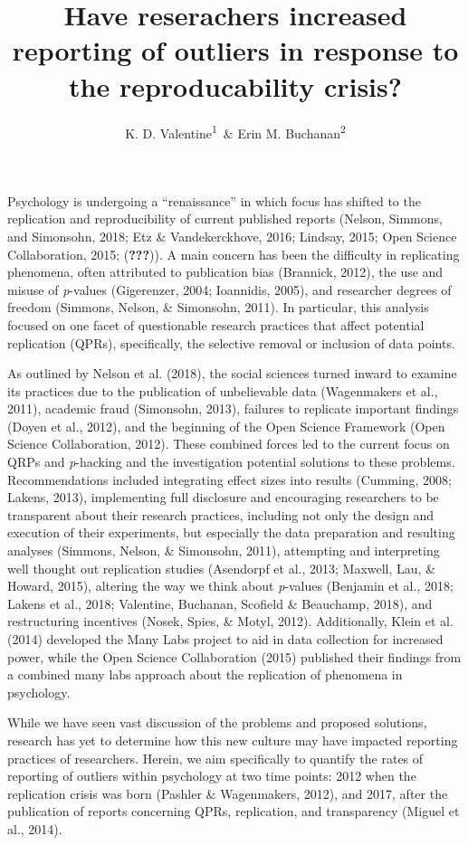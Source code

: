 \documentclass[english,man]{apa6}
\title{Have reserachers increased reporting of outliers in response to the
reproducability crisis?}
\author{K. D. Valentine\textsuperscript{1}~\& Erin M. Buchanan\textsuperscript{2}}
\affiliation{
    \vspace{0.5cm}
          \textsuperscript{1} University of Missouri\\
          \textsuperscript{2} Missouri State University  }
\theoremstyle{definition}
\theoremstyle{definition}
\theoremstyle{definition}
\theoremstyle{remark}
\begin{document}
\maketitle

\setcounter{secnumdepth}{0}



Psychology is undergoing a \enquote{renaissance} in which focus has
shifted to the replication and reproducibility of current published
reports (Nelson, Simmons, and Simonsohn, 2018; Etz \& Vandekerckhove,
2016; Lindsay, 2015; Open Science Collaboration, 2015;
({\textbf{???}})). A main concern has been the difficulty in replicating
phenomena, often attributed to publication bias (Brannick, 2012), the
use and misuse of \emph{p}-values (Gigerenzer, 2004; Ioannidis, 2005),
and researcher degrees of freedom (Simmons, Nelson, \& Simonsohn, 2011).
In particular, this analysis focused on one facet of questionable
research practices that affect potential replication (QPRs),
specifically, the selective removal or inclusion of data points.

As outlined by Nelson et al. (2018), the social sciences turned inward
to examine its practices due to the publication of unbelievable data
(Wagenmakers et al., 2011), academic fraud (Simonsohn, 2013), failures
to replicate important findings (Doyen et al., 2012), and the beginning
of the Open Science Framework (Open Science Collaboration, 2012). These
combined forces led to the current focus on QRPs and \emph{p}-hacking
and the investigation potential solutions to these problems.
Recommendations included integrating effect sizes into results (Cumming,
2008; Lakens, 2013), implementing full disclosure and encouraging
researchers to be transparent about their research practices, including
not only the design and execution of their experiments, but especially
the data preparation and resulting analyses (Simmons, Nelson, \&
Simonsohn, 2011), attempting and interpreting well thought out
replication studies (Asendorpf et al., 2013; Maxwell, Lau, \& Howard,
2015), altering the way we think about \emph{p}-values (Benjamin et al.,
2018; Lakens et al., 2018; Valentine, Buchanan, Scofield \& Beauchamp,
2018), and restructuring incentives (Nosek, Spies, \& Motyl, 2012).
Additionally, Klein et al. (2014) developed the Many Labs project to aid
in data collection for increased power, while the Open Science
Collaboration (2015) published their findings from a combined many labs
approach about the replication of phenomena in psychology.

While we have seen vast discussion of the problems and proposed
solutions, research has yet to determine how this new culture may have
impacted reporting practices of researchers. Herein, we aim specifically
to quantify the rates of reporting of outliers within psychology at two
time points: 2012 when the replication crisis was born (Pashler \&
Wagenmakers, 2012), and 2017, after the publication of reports
concerning QPRs, replication, and transparency (Miguel et al., 2014).
\end{document}
